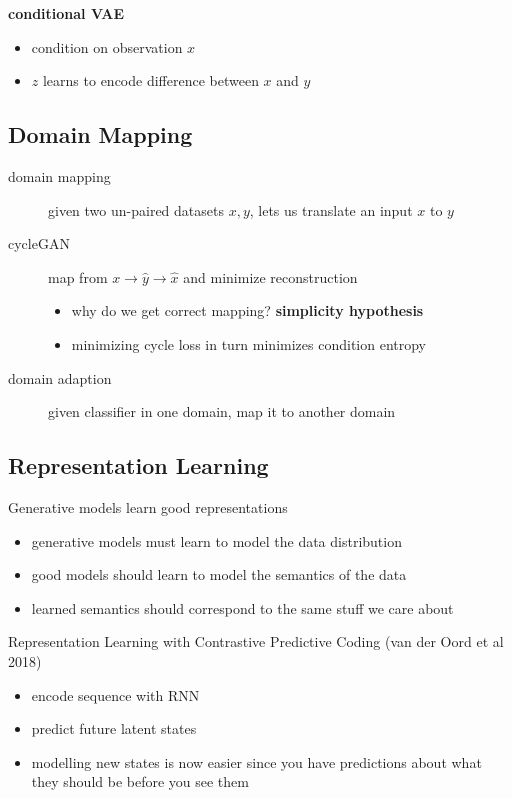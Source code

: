 \documentclass[]{article}
\theoremstyle{definition}
\begin{document}
    \textbf{conditional VAE}
    \begin{itemize}
        \item condition on observation $x$
        \item $z$ learns to encode difference between $x$ and $y$
    \end{itemize}

    \subsection{Domain Mapping}%
    \label{sub:domain_mapping}
    \begin{description}
        \item[domain mapping] given two un-paired datasets $x,y$, lets us translate an input $x$ to $y$
        \item[cycleGAN] map from $x \to \hat y \to \hat x$ and minimize reconstruction
            \begin{itemize}
                \item why do we get correct mapping? \textbf{simplicity hypothesis}
                \item minimizing cycle loss in turn minimizes condition entropy
            \end{itemize}
        \item[domain adaption] given classifier in one domain, map it to another domain
    \end{description}

    \subsection{Representation Learning}%
    \label{sub:representation_learning}

    Generative models learn good representations
    \begin{itemize}
        \item generative models must learn to model the data distribution
        \item good models should learn to model the semantics of the data
        \item learned semantics should correspond to the same stuff we care about
    \end{itemize}
    Representation Learning with Contrastive Predictive Coding (van der Oord et al 2018)
    \begin{itemize}
        \item encode sequence with RNN
        \item predict future latent states
        \item modelling new states is now easier since you have predictions about what they should be before you see them
    \end{itemize}
\end{document}
